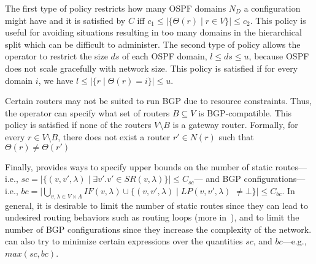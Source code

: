 The first type of policy restricts how many OSPF domains $N_D$ a
configuration might have
and it is satisfied by $C$ iff $c_1\leq |\{\Theta(r)\mid r\in V\}|\leq
c_2$.  This policy is useful for avoiding situations resulting in too
many domains in the hierarchical split which can be difficult to
administer.  The second type of policy allows the operator to restrict
the size $ds$ of each OSPF domain, $l\leq ds\leq u$, because OSPF does
not scale gracefully with network size.  This policy is satisfied if
for every domain $i$, we have $l\leq |\{r \mid \Theta(r)=i\}|\leq u$.


 Certain 
	routers may not be suited to run BGP due to resource
	constraints. Thus, the operator can specify what set of 
	routers $B\subseteq V$ is BGP-compatible.  
	This policy is satisfied if none of the routers $V\setminus B$
	is a gateway router.
	Formally, for every $r\in V\setminus B$,
	there does not exist a router $r'\in N(r)$ such that $\Theta(r) \not= \Theta(r')$



Finally, \name provides ways to specify upper bounds on the number of
static routes---i.e., $sc=|\{(v, v', \lambda)\mid \exists v'. v' \in SR(v,\lambda)\}|\leq C_{sc}$--- and
BGP configurations---i.e., 
$bc=|\bigcup_{v,\lambda\in V\times\Lambda} IF(v,\lambda)\cup \{(v,v',\lambda)\mid LP(v,v',\lambda)$ $\neq \bot\}|\leq C_{bc}$.
In general, it is desirable to limit the number of static routes since they
can lead to undesired routing behaviors such as routing loops (more in~), and to limit the number of BGP configurations
since they increase the complexity of the network.
\name can  also try to minimize certain expressions over the quantities $sc$, and $bc$---e.g., $max(sc, bc)$. 

